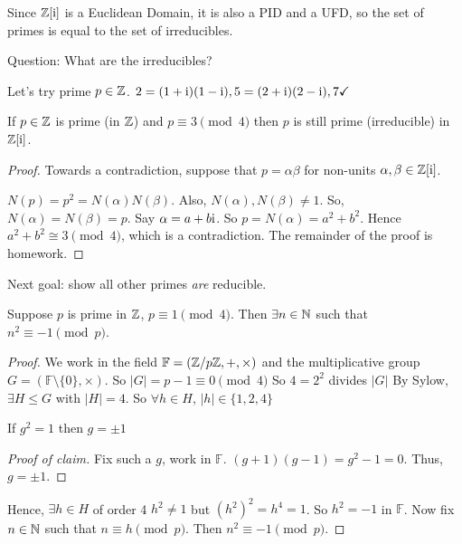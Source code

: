 \documentclass[notes.tex]{subfiles}
\begin{document}
	\begin{corollary}
		Since $\mathbb{Z}[\mathrm{i}]$ is a Euclidean Domain, it is also a PID and a UFD, so the set of primes is equal to the set of irreducibles.
	\end{corollary}
	Question: What are the irreducibles?

	Let's try prime $p\in\mathbb{Z}$.
	$2 = (1+\mathrm{i})(1-\mathrm{i}), 5 = (2+\mathrm{i})(2-\mathrm{i}), 7 \checkmark $ 

	\begin{proposition}
		If $p\in\mathbb{Z}$ is prime (in $\mathbb{Z}$) and $p\equiv 3\pmod4$ then $p$ is still prime (irreducible) in $\mathbb{Z}[\mathrm{i}]$.
	\end{proposition}
	\begin{proof}
		Towards a contradiction, suppose that $p=\alpha \beta$ for non-units $\alpha, \beta\in\mathbb{Z}[\mathrm{i}]$.

		$N(p) = p^2 = N(\alpha)N(\beta)$. Also, $N(\alpha), N(\beta)\ne 1$. So, $N(\alpha) = N(\beta) = p$. Say $\alpha = a+b\mathrm{i}$. So $p=N(\alpha)= a^2+b^2.$ Hence $a^2 +b^2\cong3\pmod4$, which is a contradiction. The remainder of the proof is homework.
	\end{proof}

	Next goal: show all other primes \emph{are} reducible.
	\begin{proposition}
		Suppose $p$ is prime in $\mathbb{Z}$, $p\equiv 1\pmod4$. Then $\exists n\in \mathbb{N}$ such that $n^2 \equiv -1\pmod p$.
	\end{proposition}
	\begin{proof}
		We work in the field $\mathbb F=(\mathbb{Z}/p\mathbb{Z}, +, \times)$ and the multiplicative group $G = (\mathbb F\setminus\{0\}, \times)$.
		So $|G| = p-1 \equiv 0\pmod4$ So $4=2^2$ divides $|G|$
		By Sylow, $\exists H\le G$ with $|H| = 4$. So $\forall h\in H$, $|h|\in\{1,2,4\}$
		\begin{claim}
			If $g^2 = 1$ then $g=\pm 1$
		\end{claim}
		\begin{proof}[Proof of claim]
			Fix such a $g$, work in $\mathbb F$.
			$(g+1)(g-1) = g^2 - 1 = 0$. Thus, $g=\pm 1$.
		\end{proof}
		Hence, $\exists h\in H$ of order 4 $h^2\ne 1$ but $(h^2)^2 = h^4 = 1$. So $h^2 = -1$ in $\mathbb F$. Now fix $n\in\mathbb{N}$ such that $n\equiv h\pmod p$. Then $n^2\equiv -1\pmod p$.
	\end{proof}
\end{document}
